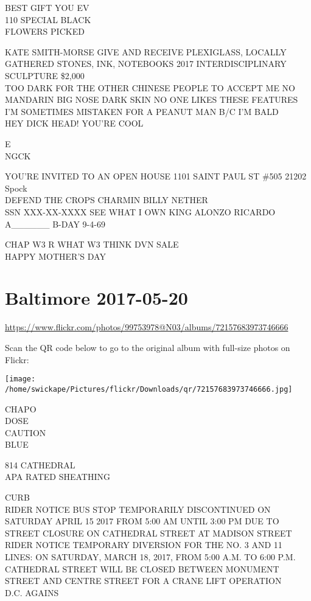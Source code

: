 \documentclass[10pt,letterpaper]{article}
\begin{document}
BEST GIFT YOU EV\\
110 SPECIAL BLACK\\
FLOWERS PICKED

KATE SMITH{-}MORSE GIVE AND RECEIVE PLEXIGLASS, LOCALLY GATHERED STONES, INK, NOTEBOOKS 2017 INTERDISCIPLINARY SCULPTURE \$2,000\\
TOO DARK FOR THE OTHER CHINESE PEOPLE TO ACCEPT ME NO MANDARIN BIG NOSE DARK SKIN NO ONE LIKES THESE FEATURES\\
I'M SOMETIMES MISTAKEN FOR A PEANUT MAN B/C I'M BALD\\
HEY DICK HEAD!  YOU'RE COOL

E\\
NGCK

YOU'RE INVITED TO AN OPEN HOUSE 1101 SAINT PAUL ST \#505 21202\\
Spock\\
DEFEND THE CROPS CHARMIN BILLY NETHER\\
SSN XXX{-}XX{-}XXXX SEE WHAT I OWN KING ALONZO RICARDO A\_\_\_\_\_\_ B{-}DAY 9{-}4{-}69

CHAP W3 R WHAT W3 THINK DVN SALE\\
HAPPY MOTHER'S DAY
\pagebreak

\section*{Baltimore 2017-05-20}

\url{https://www.flickr.com/photos/99753978@N03/albums/72157683973746666}

Scan the QR code below to go to the original album with full-size photos on Flickr:

\texttt{[image: /home/swickape/Pictures/flickr/Downloads/qr/72157683973746666.jpg]}
\pagebreak

CHAPO\\
DOSE\\
CAUTION\\
BLUE

814 CATHEDRAL\\
APA RATED SHEATHING

CURB\\
RIDER NOTICE BUS STOP TEMPORARILY DISCONTINUED ON SATURDAY APRIL 15 2017 FROM 5:00 AM UNTIL 3:00 PM DUE TO STREET CLOSURE ON CATHEDRAL STREET AT MADISON STREET\\
RIDER NOTICE TEMPORARY DIVERSION FOR THE NO. 3 AND 11 LINES: ON SATURDAY, MARCH 18, 2017, FROM 5:00 A.M. TO 6:00 P.M. CATHEDRAL STREET WILL BE CLOSED BETWEEN MONUMENT STREET AND CENTRE STREET FOR A CRANE LIFT OPERATION\\
D.C. AGAINS
\end{document}

